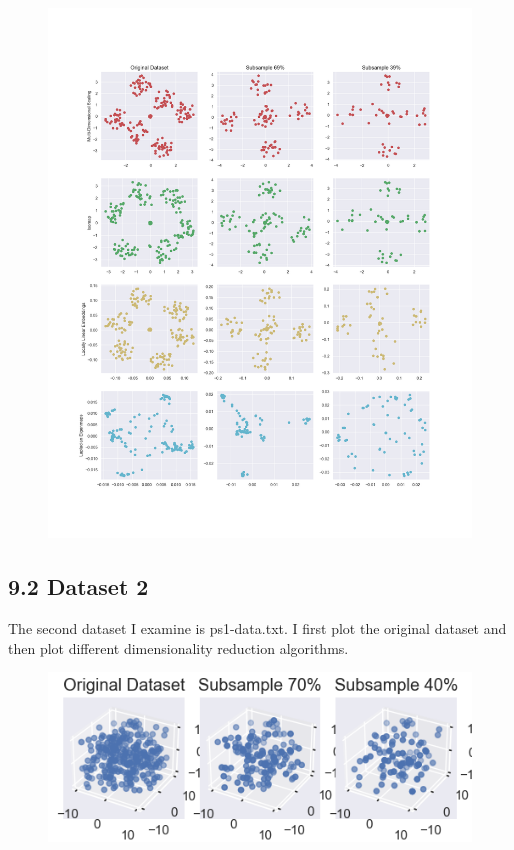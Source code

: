 \documentclass{article}
\begin{document}
            \begin{figure}[h]
                \label{fig:ps1_clustering}
                \includegraphics[width=1.2\linewidth]{images/ps1-dataset1.png}
            \end{figure}
            \clearpage
            
        \subsection*{9.2 Dataset 2}
            The second dataset I examine is ps1-data.txt. I first plot the original dataset and then plot different dimensionality reduction algorithms.
    
            \begin{figure}[h]
                \label{fig:ps2_clustering_original}
                \includegraphics[]{images/ps1-dataset2-original.png}
            \end{figure}
\end{document}
